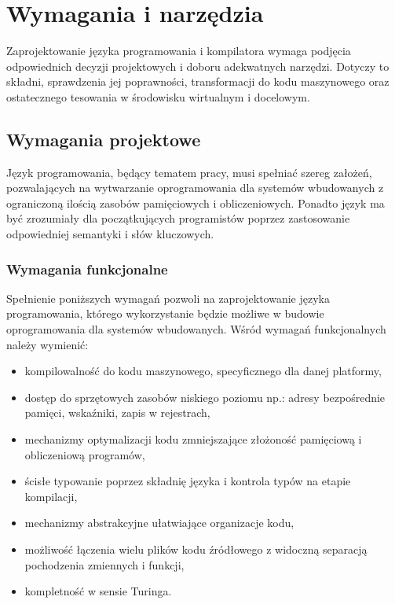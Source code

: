 \chapter{Wymagania i narzędzia}
\label{ch:03}

Zaprojektowanie języka programowania i kompilatora wymaga podjęcia odpowiednich decyzji projektowych i doboru adekwatnych narzędzi. Dotyczy to składni, sprawdzenia jej poprawności, transformacji do kodu maszynowego oraz ostatecznego tesowania w środowisku wirtualnym i docelowym.
\section{Wymagania projektowe}

Język programowania, będący tematem pracy, musi spełniać szereg założeń, pozwalających na wytwarzanie oprogramowania dla systemów wbudowanych z ograniczoną ilością zasobów pamięciowych i obliczeniowych. Ponadto język ma być zrozumiały dla początkujących programistów poprzez zastosowanie odpowiedniej semantyki i słów kluczowych.

\subsection{Wymagania funkcjonalne}
Spełnienie poniższych wymagań pozwoli na zaprojektowanie języka programowania, którego wykorzystanie będzie możliwe w budowie oprogramowania dla systemów wbudowanych. Wśród wymagań funkcjonalnych należy wymienić:
\begin{itemize}
\item kompilowalność do kodu maszynowego, specyficznego dla danej platformy,
\item dostęp do sprzętowych zasobów niskiego poziomu np.: adresy bezpośrednie pamięci, wskaźniki, zapis w rejestrach,
\item mechanizmy optymalizacji kodu zmniejszające złożoność pamięciową i obliczeniową programów,
\item ścisłe typowanie poprzez składnię języka i kontrola typów na etapie kompilacji,
\item mechanizmy abstrakcyjne ułatwiające organizacje kodu,
\item możliwość łączenia wielu plików kodu źródłowego z widoczną separacją pochodzenia zmiennych i funkcji,
\item kompletność w sensie Turinga.
\end{itemize}

